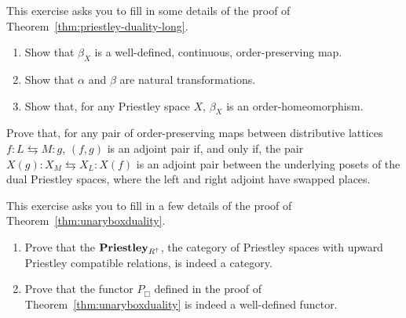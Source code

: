 \begin{exercise}\label{exe:priestleycategorically}
  This exercise asks you to fill in some details of the proof of Theorem~\ref{thm:priestley-duality-long}.
  \begin{enumerate}
  \item Show that $\beta_X$ is a well-defined, continuous, order-preserving map.
  \item Show that $\alpha$ and $\beta$ are natural transformations.
  \item Show that, for any Priestley space $X$, $\beta_X$ is an order-homeomorphism.
  \end{enumerate}
\end{exercise}

\begin{exercise}\label{exe:adjunctionpreservedbyduality}
  Prove that, for any pair of order-preserving maps between distributive lattices $f \colon L \leftrightarrows M \colon g$, $(f,g)$ is an adjoint pair if, and only if, the pair $X(g) \colon X_M \leftrightarrows X_L \colon X(f)$ is an adjoint pair between the underlying posets of the dual Priestley spaces, where the left and right adjoint have swapped places.

\end{exercise}

\begin{exercise}\label{exe:compatible-relation-duality-details}
	This exercise asks you to fill in a few details of the proof of Theorem~\ref{thm:unaryboxduality}.
	\begin{enumerate}
	\item Prove that the $\mathbf{Priestley}_{R^{\uparrow}}$, the category of Priestley spaces with upward Priestley compatible relations, is indeed a category.
	\item Prove that the functor $P_\Box$ defined in the proof of Theorem~\ref{thm:unaryboxduality} is indeed a well-defined functor.
	\end{enumerate}
\end{exercise}

